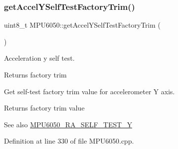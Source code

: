 \begin{DoxyCode}{0}

\end{DoxyCode}
\mbox{\label{classMPU6050_ae219dc9651d4d42a918e553b03e4e7bf}} 
\subsubsection{\texorpdfstring{getAccelYSelfTestFactoryTrim()}{getAccelYSelfTestFactoryTrim()}}
{\footnotesize\ttfamily uint8\+\_\+t M\+P\+U6050\+::get\+Accel\+Y\+Self\+Test\+Factory\+Trim (\begin{DoxyParamCaption}{ }\end{DoxyParamCaption})}

Acceleration y self test.

\begin{DoxyReturn}{Returns}
factory trim
\end{DoxyReturn}
Get self-\/test factory trim value for accelerometer Y axis. \begin{DoxyReturn}{Returns}
factory trim value 
\end{DoxyReturn}
\begin{DoxySeeAlso}{See also}
\mbox{\hyperlink{MPU6050_8h_afaeebb6ab18231c171fed704574987e7}{M\+P\+U6050\+\_\+\+R\+A\+\_\+\+S\+E\+L\+F\+\_\+\+T\+E\+S\+T\+\_\+Y}} 
\end{DoxySeeAlso}


Definition at line 330 of file M\+P\+U6050.\+cpp.


